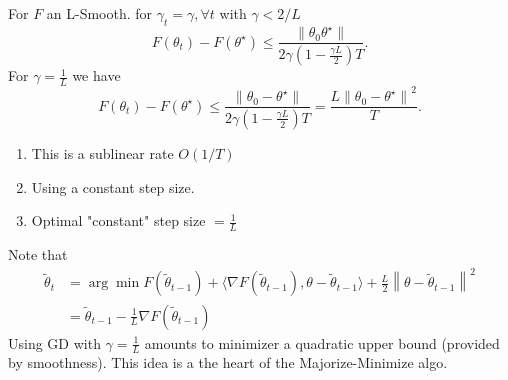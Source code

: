 \begin{thm}[]
    For $ F $ an L-Smooth. for $ \gamma _t = \gamma , \forall t $ with $ \gamma < 2/L $ 
    \[
        F(\theta _t) - F(\theta ^\star ) \leq \frac{\left\| \theta _0 \theta 
        ^\star  \right\| }{2 \gamma (1 - \frac{\gamma L}{2}) T }
    .\]
    For $ \gamma = \frac{1}{L} $ we have 
    \[
        F(\theta _t) - F(\theta ^\star ) \leq \frac{\left\| \theta _0 - \theta ^\star  \right\| }{2 \gamma (1 - \frac{\gamma L}{2}) T } = \frac{L \left\| \theta _0 - \theta ^\star  \right\| ^2}{T}
    .\]

    \begin{note}[]
        \begin{enumerate}
            \item This is a sublinear rate $ O(1/T) $
            \item Using a constant step size. \\
            \item Optimal "constant" step size $ = \frac{1}{L} $ 
        \end{enumerate}
    \end{note}

    \begin{note}[Interpolation of GD with $ \gamma = \frac{1}{L} $ ]
        Note that \begin{align*}
            \tilde{\theta }_t 
                &= \arg \min F(\tilde{\theta }_{t-1}) + \langle \nabla F(\tilde{\theta } _{t-1}), \theta  - \tilde{\theta }_{t-1} \rangle + \frac{L}{2} \left\| \theta  - \tilde{\theta }_{t - 1} \right\| ^2 \\
                &= \tilde{\theta }_{t - 1} - \frac{1}{L} \nabla F(\tilde{\theta }_{t - 1})
        \end{align*}
        Using GD with $ \gamma = \frac{1}{L} $ amounts to minimizer a quadratic upper bound (provided by smoothness). This idea is a the heart of the Majorize-Minimize algo. 
    \end{note}
\end{thm}

